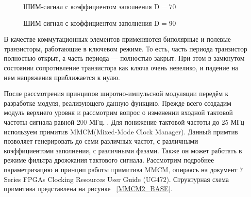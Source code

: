 \documentclass[a4paper,oneside ,14pt]{extreport}
\begin{document}
\begin{figure}[h]
    \centering
    \noindent
    \caption{ШИМ-сигнал с коэффициентом заполнения D = 70}
    \label{fig:pwm_70}
\end{figure}

\begin{figure}[h]
    \centering
    \noindent
    \caption{ШИМ-сигнал с коэффициентом заполнения D = 90}
    \label{fig:pwm_90}
\end{figure}

В качестве коммутационных элементов применяются биполярные и полевые транзисторы,
работающие в ключевом режиме. То есть, часть периода транзистор полностью открыт, 
а часть периода — полностью закрыт. При этом в замкнутом состоянии 
сопротивление транзистора как ключа очень невелико, и падение на нем напряжения приближается к нулю.

После рассмотрения принципов широтно-импульсной модуляции передём к разработке модуля, реализующего данную функцию.
Прежде всего создадим модуль верхнего уровня и рассмотрим вопрос о изменении входной тактовой частоты сигнала равной 200 МГц. .
Для понижение тактовой частоты до 25 МГц используем примитив MMCM(Mixed-Mode Clock Manager). Данный примтив позволяет генерировать до семи различных частот, с различными коэффициентоми заполнения, с различными фазами. Также он может работать в режиме фильтра дрожжания тактового сигнала.
Рассмотрим подробнее параметризацию и принцип работы примитива MMCM, опираясь на документ 7 Series FPGAs Clocking Resources User Guide (UG472). Структурная схема примитива представлена на рисунке ~\ref{MMCM2_BASE}. 
\end{document}
